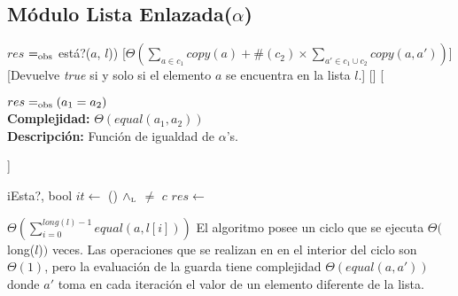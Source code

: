 \subsection{M\'odulo Lista Enlazada($\alpha$)}


  {$res$ $=_{\mathrm{obs}}$ est\'a?($a$, $l$))} %
  [$\Theta\left(\sum_{a \in c_1} copy(a) + \#(c_2) \times \sum_{a' \in c_1 \cup c_2} copy(a, a')\right)$] %
  [Devuelve \emph{true} si y solo si el elemento $a$ se encuentra en la lista $l$.] %
  [] %
  [\begin{minipage}{\linewidth}
    {$res =_{\mathrm{obs}} (a_1 = a_2)$} \\
    \textbf{Complejidad:} $\Theta(equal(a_1, a_2))$ \\
    \textbf{Descripci\'on:} Funci\'on de igualdad de $\alpha$'s.
  \end{minipage}] %


  \begin{algoritmo}{iEsta?}{, }{bool}
     $it \gets$  
    \While(){ $\land_{\mathrm{\scriptscriptstyle{L}}}$  $\neq$ $c$}{
       
    }
    $res \gets$  
  \end{algoritmo}
  \datosAlgoritmo{} %
  {} %
  {} %
  {$\Theta(\sum_{i = 0}^{long(l) - 1} equal(a, l[i]))$} %
  {El algoritmo posee un ciclo que se ejecuta $\Theta($long($l$)$)$ veces. Las operaciones que se realizan en en el interior del ciclo son $\Theta(1)$, pero la evaluaci\'on de la guarda tiene complejidad $\Theta(equal(a, a'))$ donde $a'$ toma en cada iteraci\'on el valor de un elemento diferente de la lista.} %

